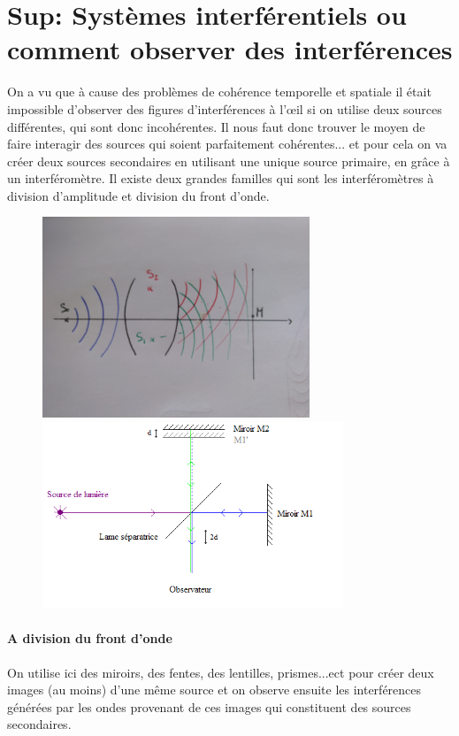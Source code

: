 \documentclass[12pt,prb,aps,epsf]{report}
\begin{document}
\section{Sup: Systèmes interférentiels ou comment observer des interférences}
On a vu que à cause des problèmes de cohérence temporelle et spatiale il était impossible d'observer des figures d'interférences à l'œil si on utilise deux sources différentes, qui sont donc incohérentes. Il nous faut donc trouver le moyen de faire interagir des sources qui soient parfaitement cohérentes... et pour cela on va créer deux sources secondaires en utilisant une unique source primaire, en grâce à un interféromètre. Il existe deux grandes familles qui sont les interféromètres à division d'amplitude et division du front d'onde.\\
\begin{figure}[h]
	\centerline{ \includegraphics[width=8cm]{divfD}
		\includegraphics[width=9cm]{michelson}}
\end{figure}
\paragraph{A division du front d'onde}On utilise ici des miroirs, des fentes, des lentilles, prismes...ect pour créer deux images (au moins) d'une même source et on observe ensuite les interférences générées par les ondes provenant de ces images qui constituent des sources secondaires.
\end{document}
